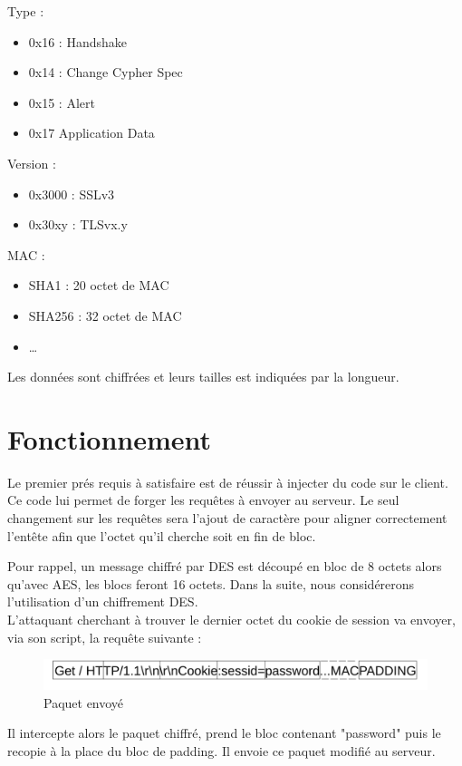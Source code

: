Type :
\begin{itemize}
\item 0x16 : Handshake
\item 0x14 : Change Cypher Spec
\item 0x15 : Alert
\item 0x17 Application Data
\end{itemize}

Version :
\begin{itemize}
\item 0x3000 : SSLv3
\item 0x30xy : TLSvx.y
\end{itemize}

MAC :
\begin{itemize}
\item SHA1 : 20 octet de MAC
\item SHA256 : 32 octet de MAC
\item \dots
\end{itemize}
Les données sont chiffrées et leurs tailles est indiquées par
la longueur.

\section{Fonctionnement}
\label{sec:fct}

Le premier prés requis à satisfaire est de réussir à injecter du code sur le client. Ce code lui permet 
de forger les requêtes à envoyer au serveur. Le seul changement sur les requêtes sera l'ajout de caractère pour
aligner correctement l'entête afin que l'octet qu'il cherche soit en fin de bloc.

Pour rappel, un message chiffré par DES est découpé en bloc de 8 octets alors qu'avec AES, les blocs feront 16 octets. Dans la suite, nous considérerons l'utilisation d'un chiffrement DES.\\ 

L'attaquant cherchant à trouver le dernier octet du cookie de session va envoyer, via son script, la requête suivante :

\begin{figure}[h]
\label{fig:packet1}
\centering
\includegraphics[scale=0.5]{Packet1}
\caption{Paquet envoyé}
\end{figure}

Il intercepte alors le paquet chiffré, prend le bloc contenant "password" puis le recopie à la
place du bloc de padding. Il envoie ce paquet modifié au serveur. 

